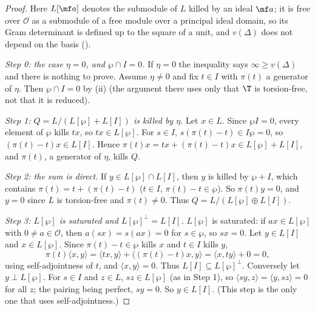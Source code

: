 \begin{proof}
Here $L[\mf a]$ denotes the submodule of $L$ killed by an ideal $\mf a$; it is free over $\mathcal O$ as a submodule of a free module over a principal ideal domain, so its Gram
determinant is defined up to the square of a unit, and $v(\Delta)$ does not depend on the basis ().

\emph{Step 0: the case $\eta=0$, and $\wp\cap I=0$.} If $\eta=0$ the inequality says $\infty\ge v(\Delta)$ and there is nothing to prove. Assume $\eta\ne0$ and fix $t\in I$ with $\pi(t)$ a
generator of $\eta$. Then $\wp\cap I=0$ by (ii) (the argument there uses only that $\T$ is torsion-free, not that it is reduced).

\emph{Step 1: $Q=L/(L[\wp]+L[I])$ is killed by $\eta$.} Let $x\in L$. Since $\wp I=0$, every element of $\wp$ kills $tx$, so $tx\in L[\wp]$. For $s\in I$, $s(\pi(t)-t)\in I\wp=0$, so $(\pi(t)-t)x\in L[I]$.
Hence $\pi(t)x=tx+(\pi(t)-t)x\in L[\wp]+L[I]$, and $\pi(t)$, a generator of $\eta$, kills $Q$.

\emph{Step 2: the sum is direct.} If $y\in L[\wp]\cap L[I]$, then $y$ is killed by $\wp+I$, which contains $\pi(t)=t+(\pi(t)-t)$ ($t\in I$, $\pi(t)-t\in\wp$). So $\pi(t)y=0$, and $y=0$ since $L$ is
torsion-free and $\pi(t)\ne0$. Thus $Q=L/(L[\wp]\oplus L[I])$.

\emph{Step 3: $L[\wp]$ is saturated and $L[\wp]^\perp=L[I]$.} $L[\wp]$ is saturated: if $ax\in L[\wp]$ with $0\ne a\in\mathcal O$, then $a(sx)=s(ax)=0$ for $s\in\wp$, so $sx=0$. Let $y\in L[I]$ and $x\in L[\wp]$. Since $\pi(t)-t\in\wp$ kills $x$ and $t\in I$ kills $y$,
\[
\pi(t)\langle x,y\rangle=\langle tx,y\rangle+\langle(\pi(t)-t)x,y\rangle=\langle x,ty\rangle+0=0,
\]
using self-adjointness of $t$, and $\langle x,y\rangle=0$. Thus
$L[I]\subseteq L[\wp]^\perp$. Conversely let $y\perp L[\wp]$. For $s\in I$ and $z\in L$, $sz\in L[\wp]$ (as in Step 1), so $\langle sy,z\rangle=\langle y,sz\rangle=0$ for all $z$; the pairing being perfect,
$sy=0$. So $y\in L[I]$. (This step is the only one that uses self-adjointness.)


\end{proof}

